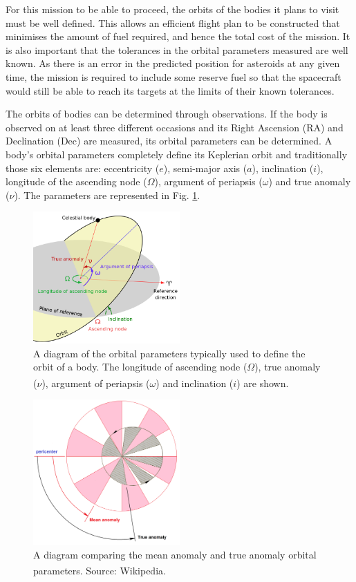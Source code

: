 \documentclass[10pt, twocolumn]{revtex4}    %
\newcommand{\scite}[1]{\textsuperscript{\cite{#1}}}
\begin{document}
For this mission to be able to proceed, the orbits of the bodies it plans to visit must be well defined. This allows an efficient flight plan to be constructed that minimises the amount of fuel required, and hence the total cost of the mission. It is also important that the tolerances in the orbital parameters measured are well known. As there is an error in the predicted position for asteroids at any given time, the mission is required to include some reserve fuel so that the spacecraft would still be able to reach its targets at the limits of their known tolerances.

The orbits of bodies can be determined through observations. If the body is observed on at least three different occasions and its Right Ascension (RA) and Declination (Dec) are measured, its orbital parameters can be determined. A body's orbital parameters completely define its Keplerian orbit and traditionally those six elements are: eccentricity ($e$), semi-major axis ($a$), inclination ($i$), longitude of the ascending node ($\Omega$), argument of periapsis ($\omega$) and true anomaly ($\nu$). The parameters are represented in Fig. \ref{fig: orbital params}.

\begin{figure}[h!]
\centering
\includegraphics[width=0.5\textwidth]{Orbit1.png}
\caption{A diagram of the orbital parameters typically used to define the orbit of a body. The longitude of ascending node ($\Omega$), true anomaly ($\nu$), argument of periapsis ($\omega$) and inclination ($i$) are shown.\scite{FileOrbit1svg}}
\label{fig: orbital params}
\end{figure}

\begin{figure}[h!]
\centering
\includegraphics[width=0.5\textwidth]{Mean_anomaly_diagram.png}
\caption{A diagram comparing the mean anomaly and true anomaly orbital parameters. Source: Wikipedia.\scite{Meananomalydiagram2015}}
\label{fig: mean-true anom}
\end{figure}
\end{document}
